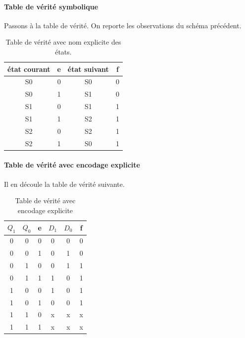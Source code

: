 \paragraph{Table de vérité symbolique}
Passons à la table de vérité. On reporte les observations du schéma précédent.
\begin{table}[!htb]
  \centering
  \begin{tabular}{|c|c||c|c|}
        \hline
        état courant & e &  état suivant & f \\ \hline
        S0 & 0 & S0 & 0 \\ \hline
        S0 & 1 & S1 & 0 \\ \hline
        S1 & 0 & S1 & 1 \\ \hline
        S1 & 1 & S2 & 1 \\ \hline
        S2 & 0 & S2 & 1 \\ \hline
        S2 & 1 & S0 & 1 \\ \hline
    \end{tabular}
    \caption{Table de vérité avec nom explicite des états.}
    \label{fig:thruth_1}
\end{table}

\paragraph{Table de vérité avec encodage explicite}
Il en découle la table de vérité suivante.
\begin{table}[!htb]
  \centering
    \begin{tabular}{|c|c|c||c|c|c|}
        \hline
        $Q_1$ & $Q_0$ &  e & $D_1$ & $D_0$ & f \\ \hline
        0 & 0 & 0 & 0 & 0 & 0 \\ \hline
        0 & 0 & 1 & 0 & 1 & 0 \\ \hline
        0 & 1 & 0 & 0 & 1 & 1 \\ \hline
        0 & 1 & 1 & 1 & 0 & 1 \\ \hline
        1 & 0 & 0 & 1 & 0 & 1 \\ \hline
        1 & 0 & 1 & 0 & 0 & 1 \\ \hline
        1 & 1 & 0 & x & x & x \\ \hline
        1 & 1 & 1 & x & x & x \\ \hline
    \end{tabular}
    \caption{Table de vérité avec encodage explicite}
    \label{fig:thruth_1}
\end{table}

